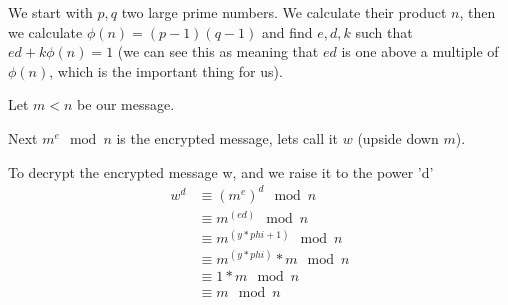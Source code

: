 \documentclass{article} \usepackage{amsmath} \usepackage[utf8]{inputenc}
\begin{document}
We start with $p,q$ two large prime numbers. We calculate their product $n$,
then we calculate $\phi(n) = (p-1)(q-1)$ and find $e,d,k$ such that $ed +
k\phi(n) = 1$ (we can see this as meaning that $ed$ is one above a multiple of
$\phi(n)$, which is the important thing for us).


Let $m < n$ be our message.

Next $m^e \mod{n}$ is the encrypted message, lets call it $w$ (upside down $m$).

 To decrypt the encrypted message w, and we raise it to the power 'd'
\begin{align}
 w^d &\equiv (m^e)^d \mod{n} \\ &\equiv m^(ed) \mod{n} \\ &\equiv m^(y*phi + 1)
 \mod{n} \\ &\equiv m^(y*phi) * m \mod{n} \\ &\equiv 1 * m \mod{n} \\ &\equiv m
 \mod{n}
\end{align}
\end{document}
